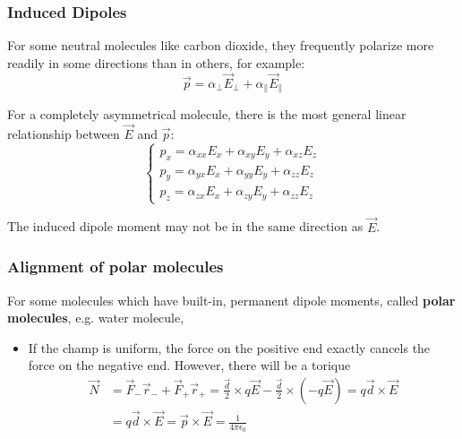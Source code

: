 \begin{frame}
  \frametitle{Induced Dipoles}

  For some neutral molecules like carbon dioxide, they frequently polarize more readily in some directions than in others, for example:
  \begin{equation}
    \overrightarrow{p} = \alpha_\perp \overrightarrow{E}_\perp + \alpha_\parallel \overrightarrow{E}_\parallel
  \end{equation}

  For a completely asymmetrical molecule, there is the most general linear relationship between $\overrightarrow{E}$ and $\overrightarrow{p}$:
  \begin{equation}
    \begin{cases}
      p_x = \alpha _{xx} E_x + \alpha _{xy} E_y + \alpha_{xz} E_z \\
      p_y = \alpha _{yx} E_x + \alpha _{yy} E_y + \alpha_{zz} E_z \\
      p_z = \alpha _{zx} E_x + \alpha _{zy} E_y + \alpha_{zz} E_z 
    \end{cases}
  \end{equation}

  The induced dipole moment may not be in the same direction as $\overrightarrow{E}$.

\end{frame}

\begin{frame}
  \frametitle{Alignment of polar molecules}


  For some molecules which have built-in, permanent dipole moments, called \textbf{polar molecules}, e.g. water molecule, 
  \begin{itemize}

      \item If the champ is uniform, the force on the positive end exactly cancels the force on the negative end. However, there will be a torique
        \begin{align}
          \overrightarrow{N} &= \overrightarrow{F}_- \overrightarrow{r}_- + \overrightarrow{F}_+  \overrightarrow{r}_+ 
                             = \frac{\overrightarrow{d}}{2} \times q \overrightarrow{E} - \frac{\overrightarrow{d}}{2} \times (-q \overrightarrow{E}) = q \overrightarrow{d} \times \overrightarrow{E} \\
                             &= q \overrightarrow{d} \times \overrightarrow{E} = \overrightarrow{p} \times \overrightarrow{E} 
                            = \displaystyle\frac{1}{4 \pi \epsilon_0} 
        \end{align}




  \end{itemize}

\end{frame}

